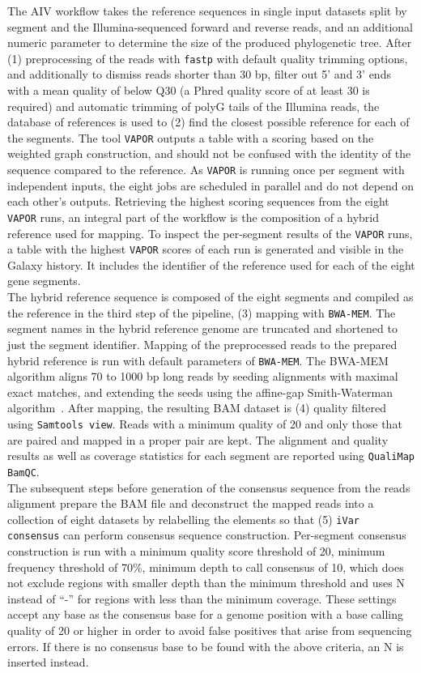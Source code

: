 The \ac{AIV} workflow takes the reference sequences in single input datasets split by segment and the Illumina-sequenced forward and reverse reads, and an additional numeric parameter to determine the size of the produced phylogenetic tree. After (1) preprocessing of the reads with \texttt{fastp} with default quality trimming options, and additionally to dismiss reads shorter than 30 bp, filter out 5' and 3' ends with a mean quality of below Q30 (a Phred quality score of at least 30 is required) and automatic trimming of polyG tails of the Illumina reads, the database of references is used to (2) find the closest possible reference for each of the segments. The tool \texttt{VAPOR} outputs a table with a scoring based on the weighted graph construction, and should not be confused with the identity of the sequence compared to the reference. As \texttt{VAPOR} is running once per segment with independent inputs, the eight jobs are scheduled in parallel and do not depend on each other's outputs. Retrieving the highest scoring sequences from the eight \texttt{VAPOR} runs, an integral part of the workflow is the composition of a hybrid reference used for mapping. To inspect the per-segment results of the \texttt{VAPOR} runs, a table with the highest \texttt{VAPOR} scores of each run is generated and visible in the Galaxy history. It includes the identifier of the reference used for each of the eight gene segments.\\
The hybrid reference sequence is composed of the eight segments and compiled as the reference in the third step of the pipeline, (3) mapping with \texttt{BWA-MEM}. The segment names in the hybrid reference genome are truncated and shortened to just the segment identifier. Mapping of the preprocessed reads to the prepared hybrid reference is run with default parameters of \texttt{BWA-MEM}. The \ac{BWA-MEM} algorithm aligns 70 to 1000 bp long reads by seeding alignments with maximal exact matches, and extending the seeds using the affine-gap Smith-Waterman algorithm~\cite{li2013aligning}. After mapping, the resulting \ac{BAM} dataset is (4) quality filtered using \texttt{Samtools view}. Reads with a minimum quality of 20 and only those that are paired and mapped in a proper pair are kept. The alignment and quality results as well as coverage statistics for each segment are reported using \texttt{QualiMap BamQC}. \\
The subsequent steps before generation of the consensus sequence from the reads alignment prepare the \ac{BAM} file and deconstruct the mapped reads into a collection of eight datasets by relabelling the elements so that (5) \texttt{iVar consensus} can perform consensus sequence construction. Per-segment consensus construction is run with a minimum quality score threshold of 20, minimum frequency threshold of 70\%, minimum depth to call consensus of 10, which does not exclude regions with smaller depth than the minimum threshold and uses N instead of ``-'' for regions with less than the minimum coverage. These settings accept any base as the consensus base for a genome position with a base calling quality of 20 or higher in order to avoid false positives that arise from sequencing errors. If there is no consensus base to be found with the above criteria, an N is inserted instead. \\
